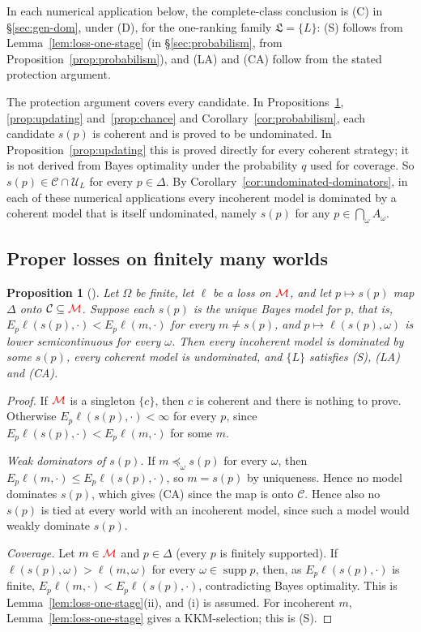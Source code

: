 \documentclass[11pt]{article}
\newcommand{\chg}[1]{{\color{red}#1}}
\newcommand{\chgb}[1]{{\color{red}#1}}
\newtheorem{proposition}[theorem]{Proposition}
\theoremstyle{definition}
\theoremstyle{remark}
\newcommand{\M}{\mathcal M}
\newcommand{\C}{\mathcal C}
\newcommand{\U}{\mathcal U}
\newcommand{\Lf}{\mathfrak L}
\newcommand{\supp}{\operatorname{supp}}
\begin{document}
\chg{In each numerical application below, the complete-class conclusion is (C) in \S\ref{sec:gen-dom}, under (D), for the one-ranking family $\Lf=\{L\}$: (S) follows from Lemma~\ref{lem:loss-one-stage}\chgb{ (in \S\ref{sec:probabilism}, from Proposition~\ref{prop:probabilism})}, and (LA) and (CA) follow from the stated protection argument.}

The protection argument covers every candidate. In Propositions~\ref{prop:proper}, \ref{prop:updating} and~\ref{prop:chance}\chgb{ and Corollary~\ref{cor:probabilism}}, each candidate $s(p)$ is coherent and is proved to be undominated. In Proposition~\ref{prop:updating} this is proved directly for every coherent strategy; it is not derived from Bayes optimality under the probability $q$ used for coverage. So $s(p)\in\C\cap\U_L$ for every $p\in\Delta$. By Corollary~\ref{cor:undominated-dominators}, in each of these numerical applications every incoherent model is dominated by a coherent model that is itself undominated, namely $s(p)$ for any $p\in\bigcap_\omega A_\omega$.

\subsection{Proper losses on finitely many worlds}

\begin{proposition}[{\cite{Predd2009,Pettigrew2022}}]\label{prop:proper}
Let $\Omega$ be finite, let $\ell$ be a loss on $\chg{\M}$, and let $p\mapsto s(p)$ map $\Delta$ onto $\C\subseteq\chg{\M}$. Suppose each $s(p)$ is the unique Bayes model for $p$, that is, $E_p\ell(s(p),\cdot)<E_p\ell(m,\cdot)$ for every $m\ne s(p)$, and $p\mapsto\ell(s(p),\omega)$ is lower semicontinuous for every $\omega$. Then every incoherent model is dominated by some $s(p)$, every coherent model is undominated, and $\{L\}$ satisfies \chg{(S), (LA) and (CA)}.
\end{proposition}
\begin{proof}
If $\chg{\M}$ is a singleton $\{c\}$, then $c$ is coherent and there is nothing to prove. Otherwise $E_p\ell(s(p),\cdot)<\infty$ for every $p$, since $E_p\ell(s(p),\cdot)<E_p\ell(m,\cdot)$ for some $m$.

\emph{Weak dominators of $s(p)$.} If $m\preceq_\omega s(p)$ for every $\omega$, then $E_p\ell(m,\cdot)\le E_p\ell(s(p),\cdot)$, so $m=s(p)$ by uniqueness. Hence no model dominates $s(p)$, which gives \chg{(CA)} since the map is onto $\C$. Hence also no $s(p)$ is tied at every world with an incoherent model, since such a model would weakly dominate $s(p)$.

\emph{Coverage.} Let $m\in\chg{\M}$ and $p\in\Delta$ (every $p$ is finitely supported). If $\ell(s(p),\omega)>\ell(m,\omega)$ for every $\omega\in\supp p$, then, as $E_p\ell(s(p),\cdot)$ is finite, $E_p\ell(m,\cdot)<E_p\ell(s(p),\cdot)$, contradicting Bayes optimality. This is Lemma~\ref{lem:loss-one-stage}(ii), and (i) is assumed. For incoherent $m$, Lemma~\ref{lem:loss-one-stage} gives a KKM-selection; this is \chg{(S)}.
\end{proof}
\end{document}
